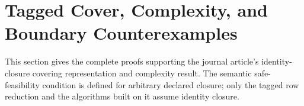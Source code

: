 \section{Tagged Cover, Complexity, and Boundary Counterexamples}
\label{sec:or-cover-complexity-proofs}

This section gives the complete proofs supporting the journal article's
identity-closure covering representation and complexity result. The semantic
safe-feasibility condition is defined for arbitrary declared closure; only the
tagged row reduction and the algorithms built on it assume identity closure.



